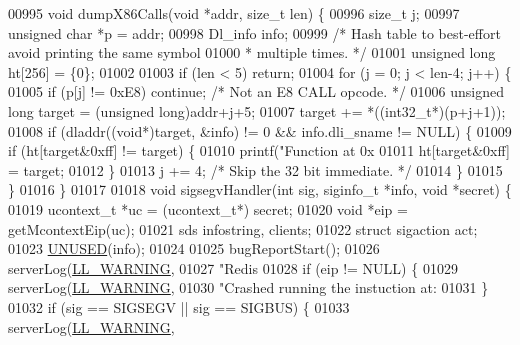 \begin{DoxyCode}
{{{{{{{{{{{{{{{{{{{{{{{{{{{{{{{{{{{{{{{{{{{{{{{{{{{{{{{{{{{{{{{{{00995 \textcolor{keywordtype}{void} dumpX86Calls(\textcolor{keywordtype}{void} *addr, size\_t len) \{
00996     size\_t j;
00997     \textcolor{keywordtype}{unsigned} \textcolor{keywordtype}{char} *p = addr;
00998     Dl\_info info;
00999     \textcolor{comment}{/* Hash table to best-effort avoid printing the same symbol}
01000 \textcolor{comment}{     * multiple times. */}
01001     \textcolor{keywordtype}{unsigned} \textcolor{keywordtype}{long} ht[256] = \{0\};
01002 
01003     \textcolor{keywordflow}{if} (len < 5) \textcolor{keywordflow}{return};
01004     \textcolor{keywordflow}{for} (j = 0; j < len-4; j++) \{
01005         \textcolor{keywordflow}{if} (p[j] != 0xE8) \textcolor{keywordflow}{continue}; \textcolor{comment}{/* Not an E8 CALL opcode. */}
01006         \textcolor{keywordtype}{unsigned} \textcolor{keywordtype}{long} target = (\textcolor{keywordtype}{unsigned} \textcolor{keywordtype}{long})addr+j+5;
01007         target += *((int32\_t*)(p+j+1));
01008         \textcolor{keywordflow}{if} (dladdr((\textcolor{keywordtype}{void}*)target, &info) != 0 && info.dli\_sname != NULL) \{
01009             \textcolor{keywordflow}{if} (ht[target&0xff] != target) \{
01010                 printf(\textcolor{stringliteral}{"Function at 0x%
01011                 ht[target&0xff] = target;
01012             \}
01013             j += 4; \textcolor{comment}{/* Skip the 32 bit immediate. */}
01014         \}
01015     \}
01016 \}
01017 
01018 \textcolor{keywordtype}{void} sigsegvHandler(\textcolor{keywordtype}{int} sig, siginfo\_t *info, \textcolor{keywordtype}{void} *secret) \{
01019     ucontext\_t *uc = (ucontext\_t*) secret;
01020     \textcolor{keywordtype}{void} *eip = getMcontextEip(uc);
01021     sds infostring, clients;
01022     \textcolor{keyword}{struct} sigaction act;
01023     \hyperlink{server_8h_ae7c9dc8f13568a9c856573751f1ee1ec}{UNUSED}(info);
01024 
01025     bugReportStart();
01026     serverLog(\hyperlink{server_8h_a31229b9334bba7d6be2a72970967a14b}{LL\_WARNING},
01027         \textcolor{stringliteral}{"Redis %
01028     \textcolor{keywordflow}{if} (eip != NULL) \{
01029         serverLog(\hyperlink{server_8h_a31229b9334bba7d6be2a72970967a14b}{LL\_WARNING},
01030         \textcolor{stringliteral}{"Crashed running the instuction at: %
01031     \}
01032     \textcolor{keywordflow}{if} (sig == SIGSEGV || sig == SIGBUS) \{
01033         serverLog(\hyperlink{server_8h_a31229b9334bba7d6be2a72970967a14b}{LL\_WARNING},
}}}}}}}}}}}}}}}}}}}}}}}}}}}}}}}}}}}}}}}}}}}}}}}}}}}}}}}}}}}}}}}}}}}}
\end{DoxyCode}
